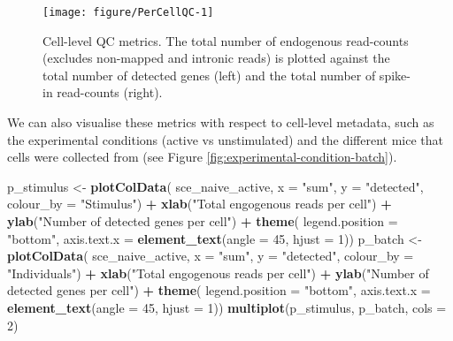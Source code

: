 \documentclass[9pt,a4paper,]{extarticle}
\newenvironment{Shaded}{\begin{snugshade}}{\end{snugshade}}
\newcommand{\DataTypeTok}[1]{\textcolor[rgb]{0.13,0.29,0.53}{#1}}
\newcommand{\DecValTok}[1]{\textcolor[rgb]{0.00,0.00,0.81}{#1}}
\newcommand{\KeywordTok}[1]{\textcolor[rgb]{0.13,0.29,0.53}{\textbf{#1}}}
\newcommand{\NormalTok}[1]{#1}
\newcommand{\OperatorTok}[1]{\textcolor[rgb]{0.81,0.36,0.00}{\textbf{#1}}}
\newcommand{\StringTok}[1]{\textcolor[rgb]{0.31,0.60,0.02}{#1}}
\begin{document}
\begin{figure}

{\centering \texttt{[image: figure/PerCellQC-1]} 

}

\caption{Cell-level QC metrics. The total number of endogenous read-counts (excludes non-mapped and intronic reads) is plotted against the total number of detected genes (left) and the total number of spike-in read-counts (right).}\label{fig:PerCellQC}
\end{figure}

We can also visualise these metrics with respect to cell-level metadata, such
as the experimental conditions (active vs unstimulated) and the different mice
that cells were collected from
(see Figure \ref{fig:experimental-condition-batch}).

\begin{Shaded}
\begin{Highlighting}[]
\NormalTok{p_stimulus <-}\StringTok{ }\KeywordTok{plotColData}\NormalTok{(}
\NormalTok{    sce_naive_active,}
    \DataTypeTok{x =} \StringTok{"sum"}\NormalTok{,}
    \DataTypeTok{y =} \StringTok{"detected"}\NormalTok{, }
    \DataTypeTok{colour_by =} \StringTok{"Stimulus"}\NormalTok{) }\OperatorTok{+}
\StringTok{  }\KeywordTok{xlab}\NormalTok{(}\StringTok{"Total engogenous reads per cell"}\NormalTok{) }\OperatorTok{+}
\StringTok{  }\KeywordTok{ylab}\NormalTok{(}\StringTok{"Number of detected genes per cell"}\NormalTok{) }\OperatorTok{+}
\StringTok{  }\KeywordTok{theme}\NormalTok{(}
    \DataTypeTok{legend.position =} \StringTok{"bottom"}\NormalTok{,}
    \DataTypeTok{axis.text.x =} \KeywordTok{element_text}\NormalTok{(}\DataTypeTok{angle =} \DecValTok{45}\NormalTok{, }\DataTypeTok{hjust =} \DecValTok{1}\NormalTok{))}
\NormalTok{p_batch <-}\StringTok{ }\KeywordTok{plotColData}\NormalTok{(}
\NormalTok{    sce_naive_active,}
    \DataTypeTok{x =} \StringTok{"sum"}\NormalTok{,}
    \DataTypeTok{y =} \StringTok{"detected"}\NormalTok{, }
    \DataTypeTok{colour_by =} \StringTok{"Individuals"}\NormalTok{) }\OperatorTok{+}
\StringTok{  }\KeywordTok{xlab}\NormalTok{(}\StringTok{"Total engogenous reads per cell"}\NormalTok{) }\OperatorTok{+}
\StringTok{  }\KeywordTok{ylab}\NormalTok{(}\StringTok{"Number of detected genes per cell"}\NormalTok{) }\OperatorTok{+}
\StringTok{  }\KeywordTok{theme}\NormalTok{(}
    \DataTypeTok{legend.position =} \StringTok{"bottom"}\NormalTok{,}
    \DataTypeTok{axis.text.x =} \KeywordTok{element_text}\NormalTok{(}\DataTypeTok{angle =} \DecValTok{45}\NormalTok{, }\DataTypeTok{hjust =} \DecValTok{1}\NormalTok{))}
\KeywordTok{multiplot}\NormalTok{(p_stimulus, p_batch, }\DataTypeTok{cols =} \DecValTok{2}\NormalTok{)}
\end{Highlighting}
\end{Shaded}
\end{document}
